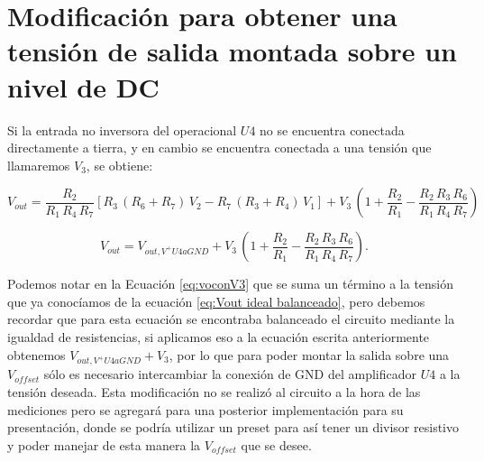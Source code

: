 \section{Modificación para obtener una tensión de salida montada sobre un nivel de DC}
	Si la entrada no inversora del operacional $\mathit{U4}$ no se encuentra conectada directamente a tierra, y en cambio se encuentra conectada a una tensión que llamaremos $V_3$, se obtiene:
	
\begin{equation}
V_{out} = \dfrac{R_2}{R_1 \, R_4 \, R_7} [R_3 \, (R_6 + R_7) \,V_2 - R_7 \, (R_3 + R_4) \,V_1] + V_3 \, \left( 1 + \dfrac{R_2}{R_1} - \dfrac{R_2 \, R_3 \, R_6}{R_1 \, R_4 \, R_7}\right)
\label{eq:voconV3}
\end{equation}

\begin{equation}
V_{out} = V_{out,V^+U4aGND} +  V_3 \, \left( 1 + \dfrac{R_2}{R_1} - \dfrac{R_2 \, R_3 \, R_6}{R_1 \, R_4 \, R_7}\right).
\end{equation}
	
	Podemos notar en la Ecuación \ref{eq:voconV3} que se suma un término a la tensión que ya conocíamos de la ecuación \ref{eq:Vout ideal balanceado}, pero debemos recordar que para esta ecuación se encontraba balanceado el circuito mediante la igualdad de resistencias, si aplicamos eso a la ecuación escrita anteriormente obtenemos $V_{out,V^+U4aGND} +  V_3$, por lo que para poder montar la salida sobre una $V_{offset}$ sólo es necesario intercambiar la conexión de GND del amplificador $\mathit{U4}$ a la tensión deseada.
	Esta modificación no se realizó al circuito a la hora de las mediciones pero se agregará para una posterior implementación para su presentación, donde se podría utilizar un preset para así tener un divisor resistivo y poder manejar de esta manera la $V_{offset}$ que se desee.